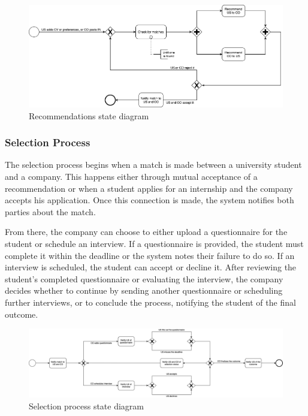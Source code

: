 \begin{figure}
    \centering
    \includegraphics[width=14cm]{images/state-diagrams/recommendations.png}
    \caption{Recommendations state diagram}
\end{figure}

\subsubsection{Selection Process}
The selection process begins when a match is made between a university student and a company.
This happens either through mutual acceptance of a recommendation or when a student applies for an internship and the company accepts his application.
Once this connection is made, the system notifies both parties about the match.

From there, the company can choose to either upload a questionnaire for the student or schedule an interview.
If a questionnaire is provided, the student must complete it within the deadline or the system notes their failure to do so.
If an interview is scheduled, the student can accept or decline it.
After reviewing the student’s completed questionnaire or evaluating the interview, the company decides whether to continue by sending another questionnaire or scheduling further interviews, or to conclude the process, notifying the student of the final outcome.

\begin{figure}
    \centering
    \includegraphics[width=16cm]{images/state-diagrams/selection-process.png}
    \caption{Selection process state diagram}
\end{figure}


